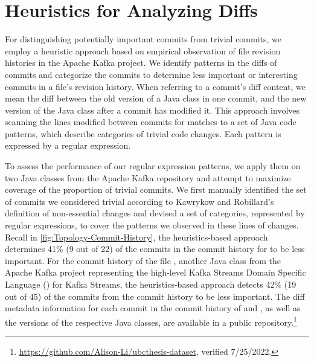 \section{Heuristics for Analyzing Diffs}
\label{sec:Heuristics}

For distinguishing potentially important commits from trivial commits, 
we employ a heuristic approach based on empirical observation of file revision histories in the Apache Kafka project.
We identify patterns in the diffs of commits and categorize the commits 
to determine less important or interesting commits in a file's revision history.
When referring to a commit's diff content, we mean the diff between the old version of a Java class in one commit, 
and the new version of the Java class after a commit has modified it.
This approach involves scanning the lines modified between commits for matches to a set of Java code patterns, 
which describe categories of trivial code changes.
Each pattern is expressed by a regular expression.

To assess the performance of our regular expression patterns, 
we apply them on two Java classes from the Apache Kafka repository and attempt to maximize coverage of the proportion of trivial commits.
We first manually identified the set of commits we considered trivial according to Kawrykow and Robillard's definition of non-essential changes \cite{kawrykow_non-essential_2011} and devised a set of categories, represented by regular expressions, to cover the patterns we observed in these lines of changes.
Recall in \autoref{fig:Topology-Commit-History}, the heuristics-based approach determines 41\% (9 out of 22) of the commits in the commit history for  to be less important.
For the commit history of the file , another Java class from the Apache Kafka project 
representing the high-level Kafka Streams Domain Specific Language () for Kafka Streams, 
the heuristics-based approach detects 42\% (19 out of 45) of the commits from the commit history to be less important.
The diff metadata information for each commit in the commit history of  
and , as well as the versions of the respective Java classes, are available in a public repository.\footnote{\url{https://github.com/Alison-Li/ubcthesis-dataset}, verified 7/25/2022.}

